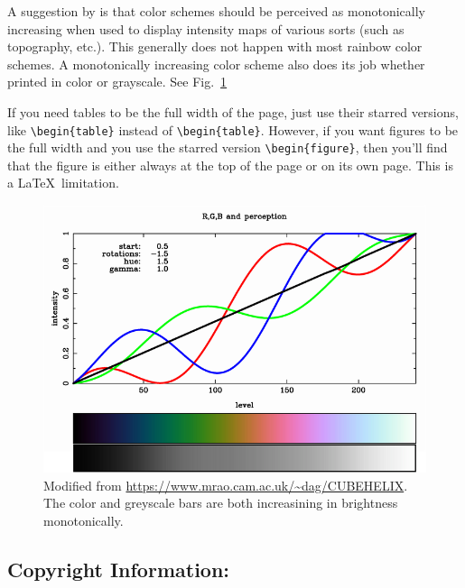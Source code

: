 \documentclass[twoside]{article}
\begin{document}
A suggestion by \citep{green2011colour} is that color schemes should be perceived as monotonically increasing when used to display intensity maps of various sorts (such as topography, etc.).
This generally does not happen with most rainbow color schemes.
A monotonically increasing color scheme also does its job whether printed in color or grayscale.
See Fig.~\ref{SaturationColors}

If you need tables to be the full width of the page, just use their starred versions, like \verb=\begin{table}= instead of \verb=\begin{table}=.
However, if you want figures to be the full width and you use the starred version \verb=\begin{figure}=, then you'll find that the figure is either always at the top of the page or on its own page.
This is a \LaTeX\ limitation.

\begin{figure}
\begin{center}
\includegraphics[width=\textwidth]{rgb-grey-morehue.png}
\caption[CubeHelix Color Schemes]{
\label{SaturationColors}
    Modified from \url{https://www.mrao.cam.ac.uk/~dag/CUBEHELIX}.
    The color and greyscale bars are both increasining in brightness monotonically.
    }
\end{center}
\end{figure}

\subsection*{\hspace{0.5cm}Copyright Information:}
\end{document}

